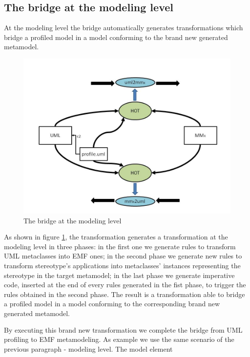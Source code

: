\subsection{The bridge at the modeling level}\label{sec:modeLevel}


At the modeling level the bridge automatically generates transformations which bridge a profiled model in a model conforming to the brand new generated metamodel.
\begin{figure}[htbp]
	\centering
		\includegraphics[width=1.00\textwidth]{figures/Diapositiva3.JPG}
	\caption{The bridge at the modeling level}
	\label{fig:Diapositiva3}
\end{figure}
As shown in figure \ref{fig:Diapositiva3}, the transformation generates a transformation at the modeling level in three phases: in the first one we generate rules to transform UML metaclasses into EMF ones; in the second phase we generate new rules to transform stereotype's applications into metaclasses' instances representing the stereotype in the target metamodel; in the last phase we generate imperative code, inserted at the end of every rules generated in the fist phase, to trigger the rules obtained in the second phase. The result is a transformation able to bridge a profiled model in a model conforming to the corresponding brand new generated metamodel.

By executing this brand new transformation we complete the bridge from UML profiling to EMF metamodeling. As example we use the same scenario of the previous paragraph - modeling level. The model element 


